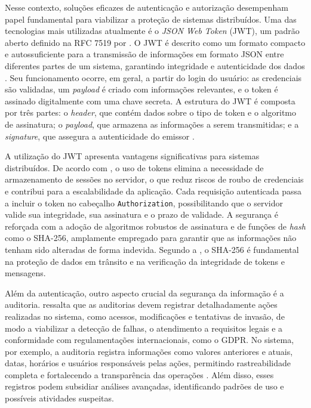 Nesse contexto, soluções eficazes de autenticação e autorização desempenham papel fundamental para viabilizar a proteção de sistemas distribuídos. Uma das tecnologias mais utilizadas atualmente é o \textit{JSON Web Token} (JWT), um padrão aberto definido na RFC 7519 por \textcite{JonesBradleySakimura2015}. O JWT é descrito como um formato compacto e autossuficiente para a transmissão de informações em formato JSON entre diferentes partes de um sistema, garantindo integridade e autenticidade dos dados \parencite{JWTIO2024}. Seu funcionamento ocorre, em geral, a partir do login do usuário: as credenciais são validadas, um \textit{payload} é criado com informações relevantes, e o token é assinado digitalmente com uma chave secreta. A estrutura do JWT é composta por três partes: o \textit{header}, que contém dados sobre o tipo de token e o algoritmo de assinatura; o \textit{payload}, que armazena as informações a serem transmitidas; e a \textit{signature}, que assegura a autenticidade do emissor \parencite{JWTIO2024}.

A utilização do JWT apresenta vantagens significativas para sistemas distribuídos. De acordo com \textcite{Bradley2020}, o uso de tokens elimina a necessidade de armazenamento de sessões no servidor, o que reduz riscos de roubo de credenciais e contribui para a escalabilidade da aplicação. Cada requisição autenticada passa a incluir o token no cabeçalho \texttt{Authorization}, possibilitando que o servidor valide sua integridade, sua assinatura e o prazo de validade. A segurança é reforçada com a adoção de algoritmos robustos de assinatura e de funções de \textit{hash} como o SHA-256, amplamente empregado para garantir que as informações não tenham sido alteradas de forma indevida. Segundo a \textcite{IBM2021}, o SHA-256 é fundamental na proteção de dados em trânsito e na verificação da integridade de tokens e mensagens.

Além da autenticação, outro aspecto crucial da segurança da informação é a auditoria. \textcite{Schneier2015} ressalta que as auditorias devem registrar detalhadamente ações realizadas no sistema, como acessos, modificações e tentativas de invasão, de modo a viabilizar a detecção de falhas, o atendimento a requisitos legais e a conformidade com regulamentações internacionais, como o GDPR. No sistema, por exemplo, a auditoria registra informações como valores anteriores e atuais, datas, horários e usuários responsáveis pelas ações, permitindo rastreabilidade completa e fortalecendo a transparência das operações \parencite{PressmanMaxim2021}. Além disso, esses registros podem subsidiar análises avançadas, identificando padrões de uso e possíveis atividades suspeitas.

